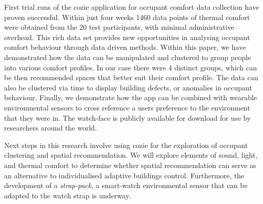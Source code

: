 
First trial runs of the cozie application for occupant comfort data collection have proven successful. Within just four weeks 1460 data points of thermal comfort were obtained from the 20 test participants, with minimal administrative overhead. This rich data set provides new opportunities in analysing occupant comfort behaviour through data driven methods. Within this paper, we have demonstrated how the data can be manipulated and clustered to group people into various comfort profiles. In our case there were 4 distinct groups, which can be then recommended spaces that better suit their comfort profile. The data can also be clustered via time to display building defects, or anomalies in occupant behaviour. Finally, we demonstrate how the app can be combined with wearable environmental sensors to cross reference a users preference to the environment that they were in. The watch-face is publicly available for download for use by researchers around the world.

Next steps in this research involve using cozie for the exploration of occupant clustering and spatial recommendation. We will explore elements of sound, light, and thermal comfort to determine whether spatial recommendation can serve as an alternative to individualised adaptive buildings control. Furthermore, the development of a \emph{strap-pack}, a smart-watch environmental sensor that can be adapted to the watch strap is underway. 